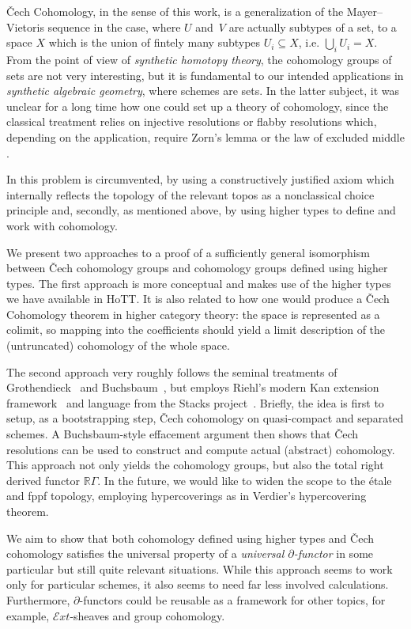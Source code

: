 \documentclass[letterpaper]{../util/easychair}
\newcommand{\notion}[1]{\emph{#1}\index{#1}}
\begin{document}
\v{C}ech Cohomology, in the sense of this work,
is a generalization of the Mayer--Vietoris sequence in the case, where $U$ and~$V$ are actually subtypes of a set,
to a space $X$ which is the union of fintely many subtypes $U_i\subseteq X$, i.e. $\bigcup_{i}U_i=X$.
From the point of view of \emph{synthetic homotopy theory}, the cohomology groups of sets are not very interesting,
but it is fundamental to our intended applications in \emph{synthetic algebraic geometry}, where schemes are sets.
In the latter subject, it was unclear for a long time how one could set up a theory of cohomology,
since the classical treatment relies on injective resolutions or flabby resolutions which, depending on the application, require Zorn's lemma or the law of excluded middle \cite{blechschmidt-flabby}.

In \cite{draft} this problem is circumvented,
by using a constructively justified axiom which internally reflects the topology of the relevant topos
as a nonclassical choice principle
and, secondly, as mentioned above, by using higher types to define and work with cohomology.

We present two approaches to a proof of a sufficiently general isomorphism between \v{C}ech cohomology groups
and cohomology groups defined using higher types.
The first approach is more conceptual and makes use of the higher types we have available in HoTT.
It is also related to how one would produce a \v{C}ech Cohomology theorem in higher category theory:
the space is represented as a colimit, so mapping into the coefficients should yield a limit description of
the (untruncated) cohomology of the whole space.

The second approach very roughly follows the seminal treatments of Grothendieck~\cite{tohoku1957} and Buchsbaum~\cite{buchsbaum}, but employs Riehl's modern Kan extension framework~\cite{riehl-cathtpy} and language from the Stacks project~\cite[Tag~05S7]{stacks-project}.
Briefly, the idea is first to setup, as a bootstrapping step, \v{C}ech
cohomology on quasi-compact and separated schemes. A Buchsbaum-style effacement argument
then shows that \v{C}ech resolutions can be used to construct and
compute actual (abstract) cohomology. This approach not only yields the
cohomology groups, but also the total right derived functor $\mathbb{R}\Gamma$.
In the future, we would like to widen the scope to the étale and fppf
topology, employing hypercoverings as in Verdier's hypercovering theorem.

We aim to show that both cohomology defined using higher types and \v{C}ech cohomology satisfies the universal property
of a \notion{universal $\partial$-functor} in some particular but still quite relevant situations.
While this approach seems to work only for particular schemes,
it also seems to need far less involved calculations.
Furthermore, $\partial$-functors could be reusable as a framework for other topics, for example, $\mathcal{E}\!xt$-sheaves and group cohomology.
\end{document}
